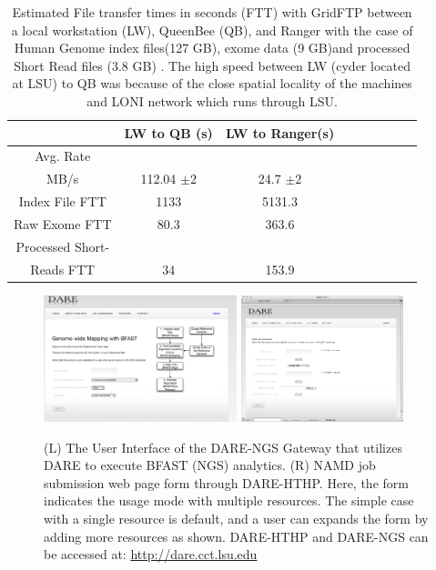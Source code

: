 \documentclass[]{svjour3}
\begin{document}
 \begin{table}
\centering
 \small
 \begin{tabular}{|c|c|c|c|c|c|c|c|c|} 
 \hline  
 	          & LW to QB (s)  & LW to Ranger(s) \\
 \hline                       
Avg. Rate && \\
MB/s & 112.04 $\pm 2$ &	    24.7 $\pm 2$  \\
 \hline                       
Index File	FTT & 1133  &	    5131.3      \\        
 \hline                       
Raw 	 Exome FTT&80.3 & 363.6\\                  
 \hline                       
Processed Short-&    & \\
Reads FTT&34&153.9  \\
 \hline                       
                    
\end{tabular}


\caption{Estimated File transfer times in seconds (FTT) with GridFTP between a local workstation (LW), QueenBee (QB), and Ranger with the case of Human Genome index files(127 GB), exome data (9 GB)and processed Short Read files (3.8 GB) . The high speed between LW (cyder located at LSU) to QB was because of the close spatial locality of the machines and LONI network which runs through LSU.  }

 \label{table:NGS-Distributed-file} 
\end{table}

\begin{figure}
 \centering
\includegraphics[width=0.5\textwidth]{figures/screenshot-ngs.png} \hspace{0.1in}
\includegraphics[width=0.42\textwidth]{figures/screenshot-hthp.png}
\caption{\small (L) The User Interface of the DARE-NGS Gateway that
  utilizes DARE to execute BFAST (NGS) analytics. (R) NAMD job
  submission web page form through DARE-HTHP. Here, the form indicates
  the usage mode with multiple resources. The simple case with a
  single resource is default, and a user can expands the form by
  adding more resources as shown. DARE-HTHP and DARE-NGS can be
  accessed at: \url{http://dare.cct.lsu.edu} }
  \label{fig:NAMD2}
\end{figure}
\end{document}
